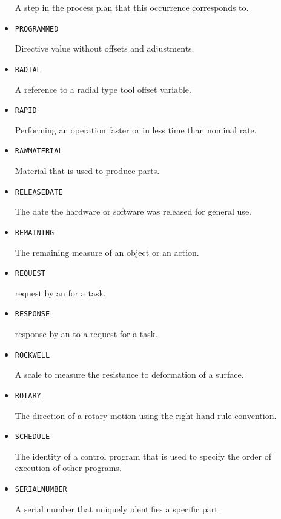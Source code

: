 \begin{itemize}
A step in the process plan that this occurrence corresponds to. 


\item \texttt{PROGRAMMED}  

Directive value without offsets and adjustments.


\item \texttt{RADIAL}  

A reference to a radial type tool offset variable.


\item \texttt{RAPID}  

Performing an operation faster or in less time than nominal rate.


\item \texttt{RAW\textunderscore MATERIAL}  

Material that is used to produce parts.


\item \texttt{RELEASE\textunderscore DATE}  

The date the hardware or software was released for general use.


\item \texttt{REMAINING}  

The remaining measure of an object or an action.


\item \texttt{REQUEST}  

\gls{request} by an  for a task.


\item \texttt{RESPONSE}  

\gls{response} by an  to a \gls{request} for a task.


\item \texttt{ROCKWELL}  

A scale to measure the resistance to deformation of a surface.


\item \texttt{ROTARY}  

The direction of a rotary motion using the right hand rule convention.


\item \texttt{SCHEDULE}  

The identity of a control program that is used to specify the order of execution of other programs.


\item \texttt{SERIAL\textunderscore NUMBER}  

A serial number that uniquely identifies a specific part.



\end{itemize}
